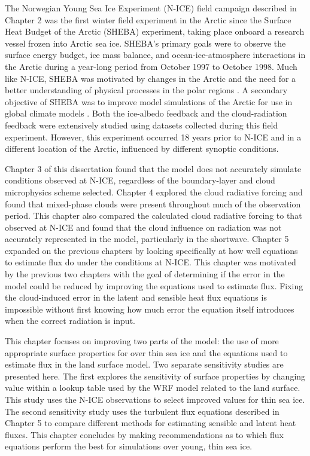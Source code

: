 The Norwegian Young Sea Ice Experiment (N-ICE) field campaign described in Chapter 2 was the first winter field experiment in the Arctic since the Surface Heat Budget of the Arctic (SHEBA) experiment, taking place onboard a research vessel frozen into Arctic sea ice. SHEBA’s primary goals were to observe the surface energy budget, ice mass balance, and ocean-ice-atmosphere interactions in the Arctic during a year-long period from October 1997 to October 1998. Much like N-ICE, SHEBA was motivated by changes in the Arctic and the need for a better understanding of physical processes in the polar regions \citep{randall:1998}. A secondary objective of SHEBA was to improve model simulations of the Arctic for use in global climate models \citep{uttal:2002}. Both the ice-albedo feedback and the cloud-radiation feedback were extensively studied using datasets collected during this field experiment. However, this experiment occurred 18 years prior to N-ICE and in a different location of the Arctic, influenced by different synoptic conditions. 

 Chapter 3 of this dissertation found that the model does not accurately simulate conditions observed at N-ICE, regardless of the boundary-layer and cloud microphysics scheme selected. Chapter 4 explored the cloud radiative forcing and found that mixed-phase clouds were present throughout much of the observation period. This chapter also compared the calculated cloud radiative forcing to that observed at N-ICE and found that the cloud influence on radiation was not accurately represented in the model, particularly in the shortwave. Chapter 5 expanded on the previous chapters by looking specifically at how well equations to estimate flux do under the conditions at N-ICE. This chapter was motivated by the previous two chapters with the goal of determining if the error in the model could be reduced by improving the equations used to estimate flux. Fixing the cloud-induced error in the latent and sensible heat flux equations is impossible without first knowing how much error the equation itself introduces when the correct radiation is input.

This chapter focuses on improving two parts of the model: the use of more appropriate surface properties for over thin sea ice and the equations used to estimate flux in the land surface model. Two separate sensitivity studies are presented here. The first explores the sensitivity of surface properties by changing value within a lookup table used by the WRF model related to the land surface. This study uses the N-ICE observations to select improved values for thin sea ice. The second sensitivity study uses the turbulent flux equations described in Chapter 5 to compare different methods for estimating sensible and latent heat fluxes. This chapter concludes by making recommendations as to which flux equations perform the best for simulations over young, thin sea ice.

